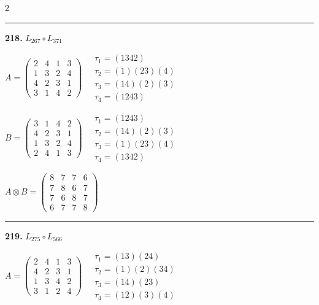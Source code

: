 \begin{multicols}{2}
\vspace{0.3em}
\hrule
\vspace{0.3em}

\noindent\textbf{218.} $L_{267} \circ L_{371}$

$A = \begin{pmatrix} 2 & 4 & 1 & 3 \\ 1 & 3 & 2 & 4 \\ 4 & 2 & 3 & 1 \\ 3 & 1 & 4 & 2 \end{pmatrix} \quad \begin{matrix} \tau_{1}=(1 3 4 2) \\ \tau_{2}=(1)(2 3)(4) \\ \tau_{3}=(1 4)(2)(3) \\ \tau_{4}=(1 2 4 3) \end{matrix}$

$B = \begin{pmatrix} 3 & 1 & 4 & 2 \\ 4 & 2 & 3 & 1 \\ 1 & 3 & 2 & 4 \\ 2 & 4 & 1 & 3 \end{pmatrix} \quad \begin{matrix} \tau_{1}=(1 2 4 3) \\ \tau_{2}=(1 4)(2)(3) \\ \tau_{3}=(1)(2 3)(4) \\ \tau_{4}=(1 3 4 2) \end{matrix}$

$A \otimes B = \begin{pmatrix} 8 & 7 & 7 & 6 \\ 7 & 8 & 6 & 7 \\ 7 & 6 & 8 & 7 \\ 6 & 7 & 7 & 8 \end{pmatrix}$

\vspace{0.3em}
\hrule
\vspace{0.3em}

\noindent\textbf{219.} $L_{275} \circ L_{566}$

$A = \begin{pmatrix} 2 & 4 & 1 & 3 \\ 4 & 2 & 3 & 1 \\ 1 & 3 & 4 & 2 \\ 3 & 1 & 2 & 4 \end{pmatrix} \quad \begin{matrix} \tau_{1}=(1 3)(2 4) \\ \tau_{2}=(1)(2)(3 4) \\ \tau_{3}=(1 4)(2 3) \\ \tau_{4}=(1 2)(3)(4) \end{matrix}$


\end{multicols}
